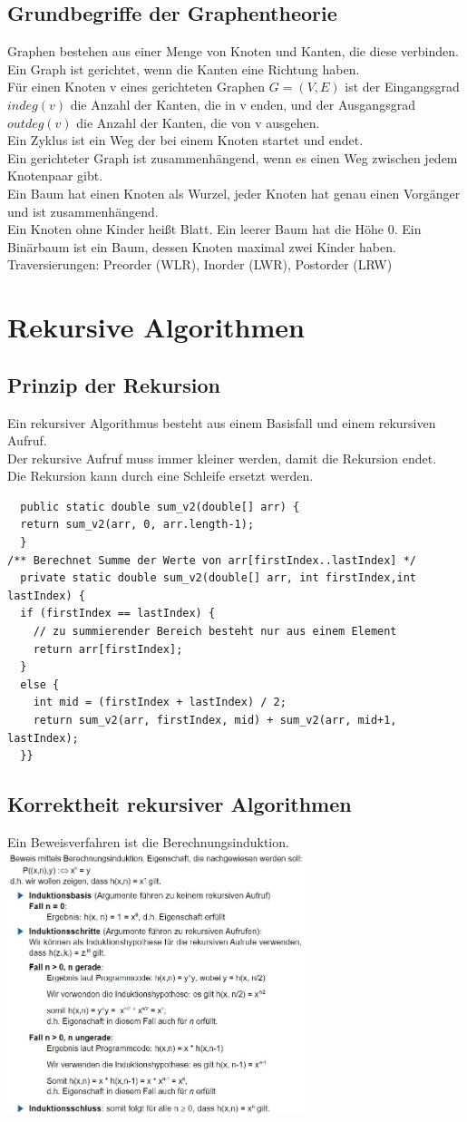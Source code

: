 \documentclass{scrreprt}
\begin{document}
\section{Grundbegriffe der Graphentheorie}
Graphen bestehen aus einer Menge von Knoten und Kanten, die diese verbinden.
\\Ein Graph ist gerichtet, wenn die Kanten eine Richtung haben.
\\Für einen Knoten v eines gerichteten Graphen $G=(V,E)$ ist der Eingangsgrad $indeg(v)$ die Anzahl der Kanten,
die in v enden, und der Ausgangsgrad $outdeg(v)$ die Anzahl der Kanten, die von v ausgehen.
\\Ein Zyklus ist ein Weg der bei einem Knoten startet und endet.
\\Ein gerichteter Graph ist zusammenhängend, wenn es einen Weg zwischen jedem Knotenpaar gibt.
\\Ein Baum hat einen Knoten als Wurzel, jeder Knoten hat genau einen Vorgänger und ist zusammenhängend.
\\Ein Knoten ohne Kinder heißt Blatt. Ein leerer Baum hat die Höhe 0.
Ein Binärbaum ist ein Baum, dessen Knoten maximal zwei Kinder haben.
\\Traversierungen: Preorder (WLR), Inorder (LWR), Postorder (LRW)
\chapter{Rekursive Algorithmen}
\section{Prinzip der Rekursion}
Ein rekursiver Algorithmus besteht aus einem Basisfall und einem rekursiven Aufruf.
\\Der rekursive Aufruf muss immer kleiner werden, damit die Rekursion endet.
\\Die Rekursion kann durch eine Schleife ersetzt werden.
\begin{lstlisting}
  public static double sum_v2(double[] arr) {
  return sum_v2(arr, 0, arr.length-1);
  }
/** Berechnet Summe der Werte von arr[firstIndex..lastIndex] */
  private static double sum_v2(double[] arr, int firstIndex,int lastIndex) {
  if (firstIndex == lastIndex) {
    // zu summierender Bereich besteht nur aus einem Element
    return arr[firstIndex];
  }
  else {
    int mid = (firstIndex + lastIndex) / 2;
    return sum_v2(arr, firstIndex, mid) + sum_v2(arr, mid+1, lastIndex);
  }}
  \end{lstlisting}
\section{Korrektheit rekursiver Algorithmen}
Ein Beweisverfahren ist die Berechnungsinduktion.
\\\includegraphics[width=0.65\textwidth]{graphics/3-2Korrektheit}
\end{document}
